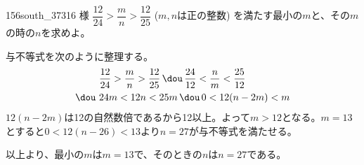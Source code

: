 \begin{thm}{156}{}{south\_37316 様}
 $\dfrac{12}{24}>\dfrac{m}{n}>\dfrac{12}{25}$ ($m, n$は正の整数) を満たす最小の$m$と、その$m$の時の$n$を求めよ。
\end{thm}

与不等式を次のように整理する。
\begin{align*}
 &\frac{12}{24}>\frac{m}{n}>\frac{12}{25} \,\dou\, \frac{24}{12}<\frac{n}{m}<\frac{25}{12} \\
 \dou\,\,& 24m<12n<25m \,\dou\, 0<12(n-2m)<m
\end{align*}
$12(n-2m)$は12の自然数倍であるから12以上。よって$m>12$となる。$m=13$とすると$0<12(n-26)<13$より$n=27$が与不等式を満たせる。

以上より、最小の$m$は$m=13$で、そのときの$n$は$n=27$である。